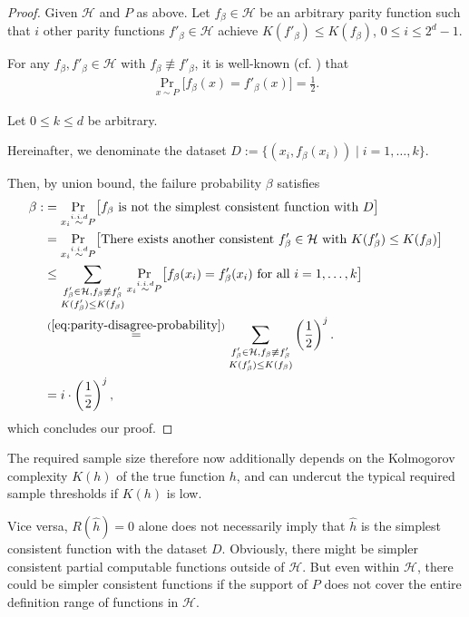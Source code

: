 \begin{proof}
	Given $\mathcal{H}$ and $P$ as above.
	Let $f_\beta\in\mathcal{H}$ be an arbitrary parity function such that $i$ other parity functions $f'_\beta\in\mathcal{H}$ achieve $K(f'_\beta)\leq K(f_\beta)$, $0\leq i\leq 2^d-1$.
	
	For any $f_\beta,f'_\beta\in\mathcal{H}$ with $f_\beta\not\equiv f'_\beta$, it is well-known (cf. \cite[Section 1.3]{o2014analysis}) that 
	\begin{align}
		\label{eq:parity-disagree-probability}
		\operatorname{Pr}_{x\sim P}\bigl[f_\beta(x)=f'_\beta(x)\bigr]=\frac{1}{2}.	
	\end{align}
	
	Let $0\leq k\leq d$ be arbitrary.
	
	Hereinafter, we denominate the dataset $D:=\{(x_i,f_\beta(x_i))\mid i=1,\dots,k\}$.
	
	Then, by union bound, the failure probability $\beta$ satisfies
	\begin{align}
	\beta :&=\underset{x_i\overset{i.i.d}{\sim} P}{\operatorname{Pr}}\bigl[f_\beta \text{ is not the simplest consistent function with } D \bigr]	\\
	&=\underset{x_i\overset{i.i.d}{\sim} P}{\operatorname{Pr}}\bigl[\text{There exists another consistent }f'_\beta\in\mathcal{H} \text{ with } K(f'_\beta)\leq K(f_\beta)\bigr]\\
	&\leq \sum_{\substack{f'_\beta\in\mathcal{H}, f_\beta\not\equiv f'_\beta \\ K(f'_\beta)\leq K(f_\beta)}} \underset{x_i\overset{i.i.d}{\sim} P}{\operatorname{Pr}}\bigl[f_\beta(x_i)=f'_\beta(x_i) \text{ for all }i=1,\dots,k \bigr]\\
	&\overset{(\ref{eq:parity-disagree-probability})}{=} \sum_{\substack{f'_\beta\in\mathcal{H}, f_\beta\not\equiv f'_\beta \\ K(f'_\beta)\leq K(f_\beta)}} \left(\frac{1}{2}\right)^j.\\
	& = i\cdot \left(\frac{1}{2}\right)^j,
	\end{align}
	which concludes our proof.
\end{proof}
The required sample size therefore now additionally depends on the Kolmogorov complexity $K(h)$ of the true function $h$, and can undercut the typical required sample thresholds if $K(h)$ is low. 

Vice versa, $R(\hat{h})=0$ alone does not necessarily imply that $\hat{h}$ is the simplest consistent function with the dataset $D$.
Obviously, there might be simpler consistent partial computable functions outside of $\mathcal{H}$.
But even within $\mathcal{H}$, there could be simpler consistent functions if the support of $P$ does not cover the entire definition range of functions in $\mathcal{H}$. 

